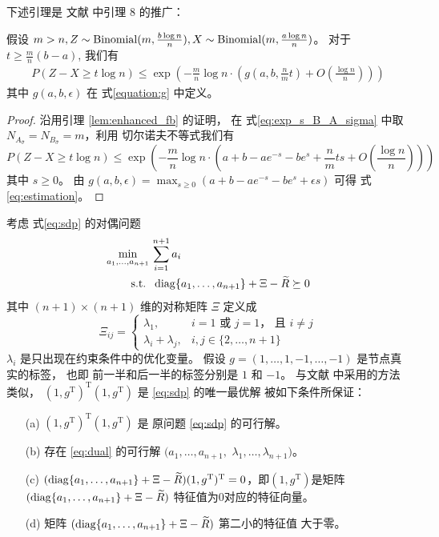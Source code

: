 下述引理是
文献
中引理 8 的推广：
\begin{lemma}\label{lem:zxt}
    假设 $m > n, Z \sim \operatorname{Binomial}(m, \frac{b\log n}{n}), X\sim \operatorname{Binomial}(m, \frac{a\log n}{n})$。
    对于 $ t \geq \frac{m}{n}(b - a)$, 我们有
    \begin{align}\label{eq:estimation}
        P(Z - X \geq t \log n) 
        \leq \exp\left(-\frac{m}{n}\log n \cdot 
        \left( g(a, b, \frac{n}{m}t) + O\left(\frac{\log n}{n} \right)
        \right)
        \right)
    \end{align}
    其中 $g(a,b,\epsilon)$ 在 式\eqref{equation:g} 中定义。
\end{lemma}
\begin{proof}
    沿用引理 \ref{lem:enhanced_fb} 的证明，
在 式\eqref{eq:exp_s_B_A_sigma}
中取  $N_{A_{\bar{\sigma}}}
=N_{B_{\bar{\sigma}}}=m$，利用
切尔诺夫不等式我们有
\begin{equation*}
    P(Z - X \geq t \log n) \leq \exp\left(-\frac{m}{n}\log n \cdot
    \left(a+b-ae^{-s}-be^s+\frac{n}{m}ts + O\left(\frac{\log n}{n} \right)
    \right)
    \right)
\end{equation*}
其中 $s \geq 0$。
由 $g(a,b,\epsilon) = 
\max_{s \geq 0} (a+b-a e^{-s} - b e^s + \epsilon s)$
可得 式 \eqref{eq:estimation}。
\end{proof}
考虑 式\eqref{eq:sdp} 的对偶问题
\begin{align}
    \min_{a_1, \dots, a_{n+1}}\, &\sum_{i=1}^{n+1} a_i \nonumber\\
    \label{eq:dual}
    \textrm{s.t. } &\, \operatorname{diag}\{a_1, \dots, a_{n+1}\} + \Xi - \widetilde{R} \succeq 0
\end{align}
其中 $(n+1)\times (n+1)$ 维的对称矩阵
$\Xi$ 定义成 
\begin{equation}
    \Xi_{ij} = \begin{cases}
        \lambda_1, & i=1\text{ 或 }j=1 \text{， 且 }i\ne j\\
        \lambda_i + \lambda_j, & i, j\in\{2,\ldots,n+1\}
    \end{cases}
\end{equation}
$\lambda_i$ 是只出现在约束条件中的优化变量。
假设 $g=(1,\ldots,1,-1,\ldots,-1)$ 是节点真实的标签，
也即
前一半和后一半的标签分别是  $1$ 和 $-1$。
与文献  中采用的方法类似，
$(1,g^{\mathrm{T}})^{\mathrm{T}}(1,g^{\mathrm{T}})$ 是 \eqref{eq:sdp} 的唯一最优解
 被如下条件所保证：
\begin{enumerate}
    \item[(a)] $(1,g^{\mathrm{T}})^{\mathrm{T}}(1,g^{\mathrm{T}})$ 是 原问题 \eqref{eq:sdp} 的可行解。
    \item[(b)] 存在 \eqref{eq:dual} 的可行解 $(a_1,\ldots,a_{n+1},$ $\lambda_1,\ldots,\lambda_{n+1})$。
    \item[(c)] $(\operatorname{diag}\{a_1, \dots, a_{n+1}\} + \Xi - \widetilde{R})(1,g^{\mathrm{T}})^{\mathrm{T}}=0$，即$(1,g^{\mathrm{T}})$是矩阵 $(\operatorname{diag}\{a_1, \dots, a_{n+1}\} + \Xi - \widetilde{R})$ 特征值为0对应的特征向量。
    \item[(d)]  矩阵 $(\operatorname{diag}\{a_1, \dots, a_{n+1}\} + \Xi - \widetilde{R})$ 第二小的特征值 大于零。 
\end{enumerate}
